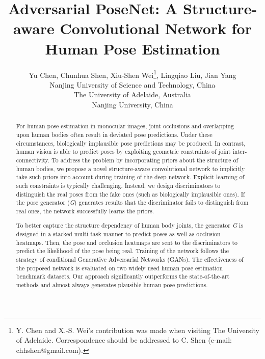 \documentclass[10pt,letterpaper,twocolumn]{article}
\begin{document}
\title{
  Adversarial PoseNet:
  A Structure-aware Convolutional Network for Human Pose Estimation
}



\author{
  Yu Chen, Chunhua Shen, Xiu-Shen Wei\thanks{Y. Chen and X.-S. Wei's 
  contribution was made when visiting The University of Adelaide. Correspondence should be addressed to C. Shen
  (e-mail: chhshen@gmail.com).  
   },
   Lingqiao Liu, Jian Yang\\ 
  Nanjing University of Science and Technology, China\\
  The University of Adelaide, Australia\\
  Nanjing University, China
}




\maketitle
\begin{abstract}
For human pose estimation in monocular images, 
joint occlusions and overlapping upon human bodies often result in deviated 
pose predictions. Under these circumstances, biologically implausible pose predictions may be produced. In contrast, human vision is able to predict poses by exploiting geometric constraints of joint inter-connectivity. To address the problem by incorporating priors about the structure of human bodies, we propose a novel structure-aware convolutional network to implicitly take such priors into account during training of the deep network. Explicit learning of such constraints is typically challenging. Instead, we design discriminators to distinguish the real poses from the fake ones (such as biologically implausible ones). If the pose generator (\textit{G}) generates results that the discriminator fails to distinguish from real ones, the network successfully learns the priors.

To better capture the structure dependency of human body joints, the generator \textit{G} is designed in a stacked multi-task manner to predict poses as well as occlusion heatmaps. Then, the pose and occlusion heatmaps are sent to the discriminators to predict the likelihood of the pose being real. Training of the  network follows the strategy of conditional Generative Adversarial Networks (GANs). The effectiveness of the proposed network is evaluated on two widely used human pose estimation benchmark datasets. Our approach significantly outperforms the state-of-the-art methods and almost always generates plausible human pose predictions.
\end{abstract}
\end{document}
